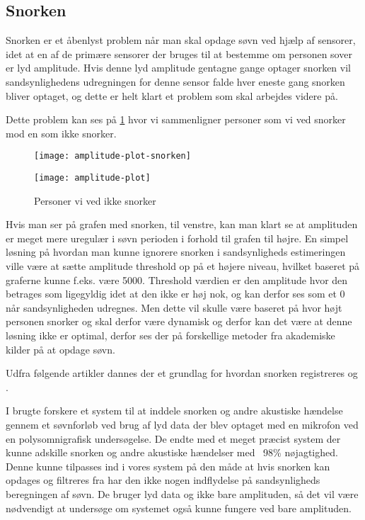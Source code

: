 \subsection{Snorken}\label{section:snorken}
Snorken er et åbenlyst problem når man skal opdage søvn ved hjælp af sensorer, idet at en af de primære sensorer der bruges til at bestemme om personen sover er lyd amplitude.
Hvis denne lyd amplitude gentagne gange optager snorken vil sandsynlighedens udregningen for denne sensor falde hver eneste gang snorken bliver optaget, og dette er helt klart et problem som skal arbejdes videre på.

Dette problem kan ses på \cref{fig:snorke-vs-ikkesnorken} hvor vi sammenligner personer som vi ved snorker mod en som ikke snorker.

\begin{figure}
\begin{minipage}{0.49\textwidth}
\texttt{[image: amplitude-plot-snorken]}
\end{minipage}
\begin{minipage}{0.49\textwidth}
\texttt{[image: amplitude-plot]}
\end{minipage}
\caption{Personer vi ved ikke snorker}
\label{fig:snorke-vs-ikkesnorken}
\end{figure}

Hvis man ser på grafen med snorken, til venstre, kan man klart se at amplituden er meget mere uregulær i søvn perioden i forhold til grafen til højre. 
En simpel løsning på hvordan man kunne ignorere snorken i sandsynligheds estimeringen ville være at sætte amplitude threshold op på et højere niveau, hvilket baseret på graferne kunne f.eks. være 5000. 
Threshold værdien er den amplitude hvor den betrages som ligegyldig idet at den ikke er høj nok, og kan derfor ses som et 0 når sandsynligheden udregnes. 
Men dette vil skulle være baseret på hvor højt personen snorker og skal derfor være dynamisk og derfor kan det være at denne løsning ikke er optimal, derfor ses der på forskellige metoder fra akademiske kilder på at opdage søvn.

Udfra følgende artikler dannes der et grundlag for hvordan snorken registreres \citep{Dafna2013} og \citep{Calabrese20111101}.

I \citep{Dafna2013} brugte forskere et system til at inddele snorken og andre akustiske hændelse gennem et søvnforløb ved brug af lyd data der blev optaget med en mikrofon ved en polysomnigrafisk undersøgelse. 
De endte med et meget præcist system der kunne adskille snorken og andre akustiske hændelser med ~98\% nøjagtighed.
Denne kunne tilpasses ind i vores system på den måde at hvis snorken kan opdages og filtreres fra har den ikke nogen indflydelse på sandsynligheds beregningen af søvn. 
De bruger lyd data og ikke bare amplituden, så det vil være nødvendigt at undersøge om systemet også kunne fungere ved bare amplituden.

